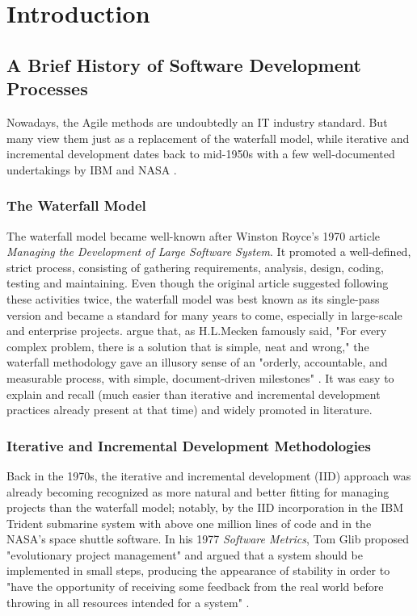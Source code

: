 \documentclass{article}
\begin{document}
\section{Introduction}
\subsection{A Brief History of Software Development Processes}
Nowadays, the Agile methods are undoubtedly an IT industry standard. But many view them just as a replacement of the waterfall model, while iterative and incremental development dates back to mid-1950s with a few well-documented undertakings by IBM and NASA \citep{larman2003iterative}.

\subsubsection{The Waterfall Model}
The waterfall model became well-known after Winston Royce's 1970 article \textit{Managing the Development of Large Software System}. It promoted a well-defined, strict process, consisting of gathering requirements, analysis, design, coding, testing and maintaining. Even though the original article suggested following these activities twice, the waterfall model was best known as its single-pass version and became a standard for many years to come, especially in large-scale and enterprise projects. \citeauthor{larman2003iterative} argue that, as H.L.Mecken famously said, "For every complex problem, there is a solution that is simple, neat and wrong," the waterfall methodology gave an illusory sense of an "orderly, accountable, and measurable process, with simple, document-driven milestones" \citep[55]{larman2003iterative}. It was easy to explain and recall (much easier than iterative and incremental development practices already present at that time) and widely promoted in literature.

\subsubsection{Iterative and Incremental Development Methodologies}
Back in the 1970s, the iterative and incremental development (IID) approach was already becoming recognized as more natural and better fitting for managing projects than the waterfall model; notably, by the IID incorporation in the IBM Trident submarine system with above one million lines of code and in the NASA's space shuttle software. In his 1977 \textit{Software Metrics}, Tom Glib proposed "evolutionary project management" and argued that a system should be implemented in small steps, producing the appearance of stability in order to "have the opportunity of receiving some feedback from the real world before throwing in all resources intended for a system" \citep[214]{gilb1977software}.
\end{document}
